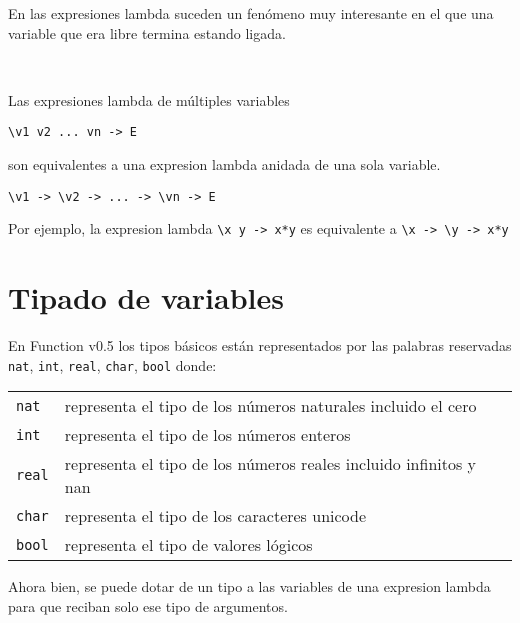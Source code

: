       En las expresiones lambda suceden un fenómeno muy interesante en el que una variable que era libre termina estando ligada.
      
      \begin{fxcode}
          \\
          
      \end{fxcode}
      
      Las expresiones lambda de múltiples variables
         \begin{center}
            \texttt{\textbackslash v1 v2 ... vn ->~E}
         \end{center}
      son equivalentes a una expresion lambda anidada de una sola variable.
         \begin{center}
            \texttt{\textbackslash v1 ->~\textbackslash v2 ->~... ->~\textbackslash vn ->~E}
         \end{center}
      
      Por ejemplo, la expresion lambda \texttt{\textbackslash x y ->~x*y} es equivalente a \texttt{\textbackslash x ->~\textbackslash y ->~x*y}
      
   \section{Tipado de variables}
      En Function v0.5 los tipos básicos están representados por las palabras reservadas \texttt{nat}, \texttt{int}, \texttt{real}, \texttt{char}, \texttt{bool} donde:
      
      \begin{longtable}[c]{ll}
         \texttt{nat}     & representa el tipo de los números naturales incluido el cero \\
         \texttt{int}     & representa el tipo de los números enteros\\
         \texttt{real}    & representa el tipo de los números reales incluido infinitos y nan\\
         \texttt{char}    &representa el tipo de los caracteres unicode\\
         \texttt{bool}    &representa el tipo de valores lógicos
      \end{longtable}
      
      Ahora bien, se puede dotar de un tipo a las variables de una expresion lambda para que reciban solo ese tipo de argumentos.
      \\
      
